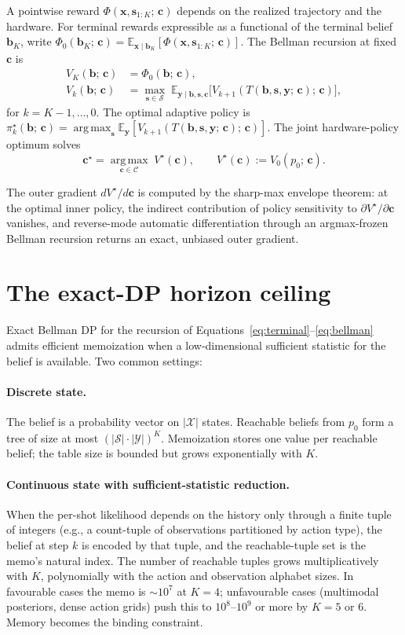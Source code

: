 \documentclass[11pt,a4paper]{article}
\newcommand{\bc}{\bm{c}}
\newcommand{\bx}{\bm{x}}
\newcommand{\by}{\bm{y}}
\newcommand{\bs}{\bm{s}}
\newcommand{\bb}{\bm{b}}
\newcommand{\E}{\mathbb{E}}
\newcommand{\argmax}{\operatorname*{arg\,max}}
\begin{document}
A pointwise reward $\Phi(\bx, \bs_{1:K};\, \bc)$ depends on the realized trajectory and the
hardware.  For terminal rewards expressible as a functional of the terminal belief
$\bb_K$, write $\Phi_0(\bb_K;\, \bc) = \E_{\bx \mid \bb_K}[\Phi(\bx, \bs_{1:K};\, \bc)]$.
The Bellman recursion at fixed $\bc$ is
\begin{align}
V_K(\bb;\, \bc) &= \Phi_0(\bb;\, \bc), \label{eq:terminal}\\
V_k(\bb;\, \bc) &= \max_{\bs \in \mathcal{S}}\; \E_{\by \mid \bb, \bs, \bc}\!\bigl[V_{k+1}(T(\bb, \bs, \by;\, \bc);\, \bc)\bigr], \label{eq:bellman}
\end{align}
for $k = K-1, \ldots, 0$.  The optimal adaptive policy is
$\pi^\star_k(\bb;\, \bc) = \argmax_{\bs} \E_{\by}[V_{k+1}(T(\bb, \bs, \by;\, \bc);\, \bc)]$.
The joint hardware-policy optimum solves
\begin{equation}
\bc^\star = \argmax_{\bc \in \mathcal{C}}\; V^\star(\bc), \qquad V^\star(\bc) := V_0(p_0;\, \bc).
\label{eq:joint}
\end{equation}

The outer gradient $dV^\star/d\bc$ is computed by the sharp-max envelope theorem: at the
optimal inner policy, the indirect contribution of policy sensitivity to $\partial V^\star /
\partial \bc$ vanishes, and reverse-mode automatic differentiation through an
argmax-frozen Bellman recursion returns an exact, unbiased outer gradient.

\section{The exact-DP horizon ceiling}
\label{sec:ceiling}

Exact Bellman DP for the recursion of Equations~\eqref{eq:terminal}--\eqref{eq:bellman}
admits efficient memoization when a low-dimensional sufficient statistic for the belief is
available.  Two common settings:

\paragraph{Discrete state.}  The belief is a probability vector on $|\mathcal{X}|$ states.
Reachable beliefs from $p_0$ form a tree of size at most $(|\mathcal{S}| \cdot
|\mathcal{Y}|)^K$.  Memoization stores one value per reachable belief; the table size is
bounded but grows exponentially with $K$.

\paragraph{Continuous state with sufficient-statistic reduction.}  When the per-shot
likelihood depends on the history only through a finite tuple of integers (e.g., a
count-tuple of observations partitioned by action type), the belief at step $k$ is
encoded by that tuple, and the reachable-tuple set is the memo's natural index.  The
number of reachable tuples grows multiplicatively with $K$, polynomially with the action
and observation alphabet sizes.  In favourable cases the memo is $\sim 10^7$ at $K = 4$;
unfavourable cases (multimodal posteriors, dense action grids) push this to $10^8$--$10^9$
or more by $K = 5$ or $6$.  Memory becomes the binding constraint.
\end{document}
